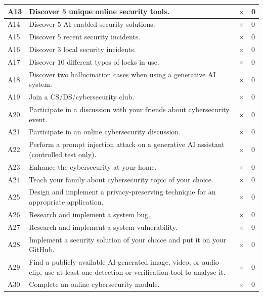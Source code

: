 \documentclass[titlepage]{article}
\begin{document}
\begin{tabular}{ |p{4em}|p{30em}|C{6em}|C{5em}| }
            \hline
            A13 & Discover 5 unique online security tools. & $\times$ & 0 \\
            \hline
            A14 & Discover 5 AI-enabled security solutions. & $\times$ & 0 \\
            \hline
            A15 & Discover 5 recent security incidents. & $\times$ & 0 \\
            \hline
            A16 & Discover 3 local security incidents. & $\times$ & 0 \\
            \hline
            A17 & Discover 10 different types of locks in use. & $\times$ & 0 \\
            \hline
            A18 & Discover two hallucination cases when using a generative AI system. & $\times$ & 0 \\
            \hline
            A19 & Join a CS/DS/cybersecurity club. & $\times$ & 0 \\
            \hline
            A20 & Participate in a discussion with your friends about cybersecurity event. & $\times$ & 0 \\
            \hline
            A21 & Participate in an online cybersecurity discussion. & $\times$ & 0 \\
            \hline
            A22 & Perform a prompt injection attack on a generative AI assistant (controlled test only). & $\times$ & 0 \\
            \hline
            A23 & Enhance the cybersecurity at your home. & $\times$ & 0 \\
            \hline
            A24 & Teach your family about cybersecurity topic of your choice. & $\times$ & 0 \\
            \hline
            A25 & Design and implement a privacy-preserving technique for an appropriate application. & $\times$ & 0 \\
            \hline
            A26 & Research and implement a system bug. & $\times$ & 0 \\
            \hline
            A27 & Research and implement a system vulnerability. & $\times$ & 0 \\
            \hline
            A28 & Implement a security solution of your choice and put it on your GitHub. & $\times$ & 0 \\
            \hline
            A29 & Find a publicly available AI-generated image, video, or audio clip, use at least one detection or verification tool to analyse it. & $\times$ & 0 \\
            \hline
            A30 & Complete an online cybersecurity module. & $\times$ & 0 \\
            \hline
        \end{tabular}
\end{document}
